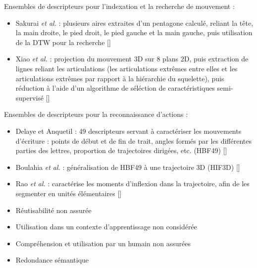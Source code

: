 \documentclass[svgnames]{beamer}
\newcommand{\mycite}[1]{[\textit{\cite{#1}}]}
\begin{document}
	\begin{frame}{\subsecname}
		Ensembles de descripteurs pour l'indexation et la recherche de mouvement :
		\begin{itemize}[label=$\bullet$]
			\item Sakurai \textit{et al.} : plusieurs aires extraites d'un pentagone calculé, reliant la tête, la main droite, le pied droit, le pied gauche et la main gauche, puis utilisation de la DTW pour la recherche \mycite{Sakurai2015Ros}
			\item Xiao \textit{et al.} : projection du mouvement 3D sur 8 plans 2D, puis extraction de lignes reliant les articulations (les articulations extrêmes entre elles et les articulations extrêmes par rapport à la hiérarchie du squelette), puis réduction à l'aide d'un algorithme de séléction de caractéristiques semi-supervisé \mycite{Xiao2015Sbh}
		\end{itemize}
	\end{frame}
	
	\begin{frame}{\subsecname}
		Ensembles de descripteurs pour la reconnaissance d'actions :
		\begin{itemize}[label=$\bullet$]
			\item  Delaye et Anquetil : 49 descripteurs servant à caractériser les mouvements d'écriture : points de début et de fin de trait, angles formés par les différentes parties des lettres, proportion de trajectoires dirigées, etc. (HBF49) \mycite{Delaye2013HBF}
			\item Boulahia \textit{et al.} : généralisation de HBF49 à une trajectoire 3D (HIF3D) \mycite{Boulahia2016HIF}
			\item Rao \textit{et al.} : caractérise les moments d'inflexion dans la trajectoire, afin de les segmenter en unités élémentaires \mycite{Rao2002VRR}
		\end{itemize}
	\end{frame}
	
	\begin{frame}{\subsecname}
		\begin{itemize}[label=$\bullet$]
			\item Réutisabilité non assurée
			\item Utilisation dans un contexte d'apprentissage non considérée
			\item Compréhension et utilisation par un humain non assurées
			\item Redondance sémantique
		\end{itemize}
	\end{frame}
	
\end{document}
